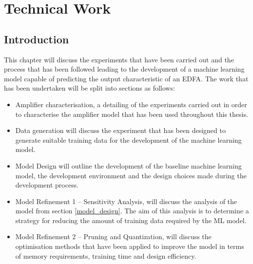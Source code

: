 \chapter{Technical Work}
\label{ch:tw}



\section{Introduction} 
\label{tw:intro}

This chapter will discuss the experiments that have been carried out and the process that has been followed leading to the development of a machine learning model capable of predicting the output characteristic of an EDFA. 
The work that has been undertaken will be split into sections as follows:
\begin{itemize}
    \item Amplifier characterisation, a detailing of the experiments carried out in order to characterise the amplifier model that has been used throughout this thesis.
    
    \item Data generation will discuss the experiment that has been designed to generate suitable training data for the development of the machine learning model.
    
    \item Model Design will outline the development of the baseline machine learning model, the development environment and the design choices made during the development process.
    
    \item Model Refinement 1 – Sensitivity Analysis, will discuss the analysis of the model from section \ref{model_design}. The aim of this analysis is to determine a strategy for reducing the amount of training data required by the ML model.
    
    \item Model Refinement 2 – Pruning and Quantization, will discuss the optimisation methods that have been applied to improve the model in terms of memory requirements, training time and design efficiency. 
\end{itemize}



